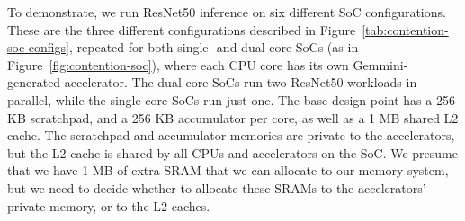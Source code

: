 

To demonstrate, we run ResNet50 inference on six different SoC configurations. These are the three different configurations described in Figure~\ref{tab:contention-soc-configs}, repeated for both single- and dual-core SoCs (as in Figure~\ref{fig:contention-soc}), where each CPU core has its own Gemmini-generated accelerator. The dual-core SoCs run two ResNet50 workloads in parallel, while the single-core SoCs run just one. The base design point has a 256 KB scratchpad, and a 256 KB accumulator per core, as well as a 1 MB shared L2 cache. The scratchpad and accumulator memories are private to the accelerators, but the L2 cache is shared by all CPUs and accelerators on the SoC. We presume that we have 1 MB of extra SRAM that we can allocate to our memory system, but we need to decide whether to allocate these SRAMs to the accelerators' private memory, or to the L2 caches.


